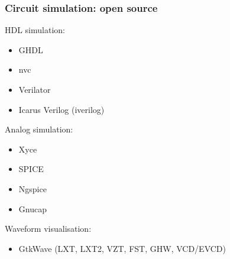 \documentclass{beamer}
\begin{document}
\begin{frame}
\frametitle{Circuit simulation: open source}
\begin{minipage}[t]{.58\linewidth}
HDL simulation:
\begin{itemize}
\item GHDL
\href{https://github.com/ghdl/ghdl}{\faGithub}
\href{https://ghdl.rtfd.io}{\faBook}

\item nvc
\href{https://github.com/nickg/nvc}{\faGithub}

\item Verilator
\href{https://www.veripool.org/wiki/verilator}{\faGlobe}
\href{https://github.com/verilator/verilator}{\faGithub}

\item Icarus Verilog (iverilog)
\href{http://iverilog.icarus.com/}{\faGlobe}
\href{https://github.com/steveicarus/iverilog}{\faGithub}
\end{itemize}
\end{minipage}
\begin{minipage}[t]{.405\linewidth}
Analog simulation:
\begin{itemize}
\item Xyce \href{https://xyce.sandia.gov/}{\faGlobe} \href{https://github.com/Xyce/Xyce}{\faGithub}
\item SPICE \href{https://en.wikipedia.org/wiki/SPICE}{\faWikipediaW}
\item Ngspice \href{http://ngspice.sourceforge.net/}{\faGlobe}
\item Gnucap \href{http://gnucap.org}{\faGlobe}
\end{itemize}
\end{minipage}

\vfill
Waveform visualisation:
\begin{itemize}
\item GtkWave (LXT, LXT2, VZT, FST, GHW, VCD/EVCD)
\href{http://gtkwave.sourceforge.net/}{\faGlobe}
\href{https://github.com/gtkwave/gtkwave}{\faGithub}
\end{itemize}

\end{frame}
\end{document}
